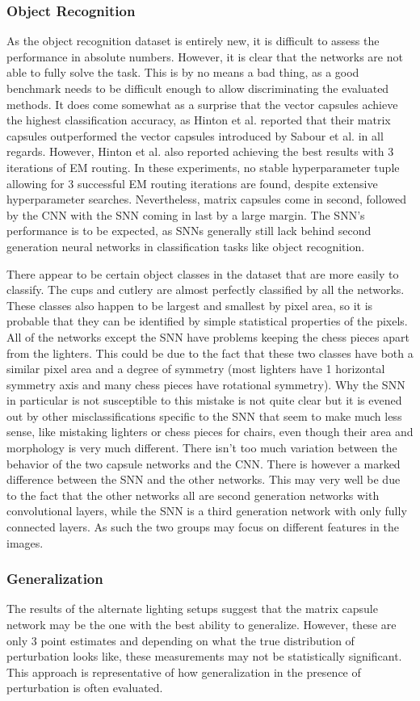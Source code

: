 \subsubsection{Object Recognition}
As the object recognition dataset is entirely new, it is difficult to assess the performance in absolute numbers. However, it is clear that the networks are not able to fully solve the task. This is by no means a bad thing, as a good benchmark needs to be difficult enough to allow discriminating the evaluated methods. It does come somewhat as a surprise that the vector capsules achieve the highest classification accuracy, as Hinton et al. reported that their matrix capsules outperformed the vector capsules introduced by Sabour et al. in all regards. However, Hinton et al. also reported achieving the best results with 3 iterations of EM routing. In these experiments, no stable hyperparameter tuple allowing for 3 successful EM routing iterations are found, despite extensive hyperparameter searches. Nevertheless, matrix capsules come in second, followed by the CNN with the SNN coming in last by a large margin. The SNN’s performance is to be expected, as SNNs generally still lack behind second generation neural networks in classification tasks like object recognition.

There appear to be certain object classes in the dataset that are more easily to classify. The cups and cutlery are almost perfectly classified by all the networks. These classes also happen to be largest and smallest by pixel area, so it is probable that they can be identified by simple statistical properties of the pixels. All of the networks except the SNN have problems keeping the chess pieces apart from the lighters. This could be due to the fact that these two classes have both a similar pixel area and a degree of symmetry (most lighters have 1 horizontal symmetry axis and many chess pieces have rotational symmetry). Why the SNN in particular is not susceptible to this mistake is not quite clear but it is evened out by other misclassifications specific to the SNN that seem to make much less sense, like mistaking lighters or chess pieces for chairs, even though their area and morphology is very much different. There isn’t too much variation between the behavior of the two capsule networks and the CNN. There is however a marked difference between the SNN and the other networks. This may very well be due to the fact that the other networks all are second generation networks with convolutional layers, while the SNN is a third generation network with only fully connected layers. As such the two groups may focus on different features in the images.\newpage
\vspace{.5cm}\subsubsection{Generalization}
The results of the alternate lighting setups suggest that the matrix capsule network may be the one with the best ability to generalize. However, these are only 3 point estimates and depending on what the true distribution of perturbation looks like, these measurements may not be statistically significant. This approach is representative of how generalization in the presence of perturbation is often evaluated.

